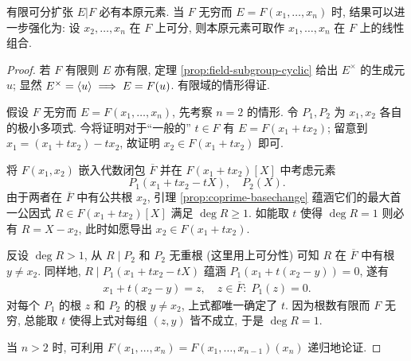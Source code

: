 \begin{theorem}\label{prop:prim-element-separable}
	有限可分扩张 $E|F$ 必有本原元素. 当 $F$ 无穷而 $E=F(x_1, \ldots, x_n)$ 时, 结果可以进一步强化为: 设 $x_2, \ldots, x_n$ 在 $F$ 上可分, 则本原元素可取作 $x_1, \ldots, x_n$ 在 $F$ 上的线性组合.
\end{theorem}
\begin{proof}
	若 $F$ 有限则 $E$ 亦有限, 定理 \ref{prop:field-subgroup-cyclic} 给出 $E^\times$ 的生成元 $u$; 显然 $E^\times = \left\langle u \right\rangle \implies E=F(u)$. 有限域的情形得证.
	
	假设 $F$ 无穷而 $E=F(x_1, \ldots, x_n)$, 先考察 $n=2$ 的情形. 令 $P_1, P_2$ 为 $x_1, x_2$ 各自的极小多项式. 今将证明对于``一般的'' $t \in F$ 有 $E=F(x_1 + tx_2)$; 留意到 $x_1 = (x_1 + tx_2) - tx_2$, 故证明 $x_2 \in F(x_1 + tx_2)$ 即可.
	
	将 $F(x_1, x_2)$ 嵌入代数闭包 $\overline{F}$ 并在 $F(x_1 + tx_2)[X]$ 中考虑元素
	\[ P_1(x_1 + tx_2 - tX), \quad P_2(X). \]
	由于两者在 $\overline{F}$ 中有公共根 $x_2$, 引理 \ref{prop:coprime-basechange} 蕴涵它们的最大首一公因式 $R \in F(x_1 + tx_2)[X]$ 满足 $\deg R \geq 1$. 如能取 $t$ 使得 $\deg R=1$ 则必有 $R = X-x_2$, 此时如愿导出 $x_2 \in F(x_1 + tx_2)$.
	
	反设 $\deg R > 1$, 从 $R \mid P_2$ 和 $P_2$ 无重根 (这里用上可分性) 可知 $R$ 在 $\overline{F}$ 中有根 $y \neq x_2$. 同样地, $R \mid P_1(x_1 + tx_2 - tX)$ 蕴涵 $P_1(x_1 + t(x_2-y))=0$, 遂有
	\begin{gather*}
		x_1 + t(x_2 - y) = z, \quad z \in \overline{F}:\; P_1(z)=0.
	\end{gather*}
	对每个 $P_1$ 的根 $z$ 和 $P_2$ 的根 $y \neq x_2$, 上式都唯一确定了 $t$. 因为根数有限而 $F$ 无穷, 总能取 $t$ 使得上式对每组 $(z,y)$ 皆不成立, 于是 $\deg R = 1$.
	
	当 $n > 2$ 时, 可利用 $F(x_1, \ldots, x_n) = F(x_1, \ldots, x_{n-1})(x_n)$ 递归地论证.
\end{proof}

